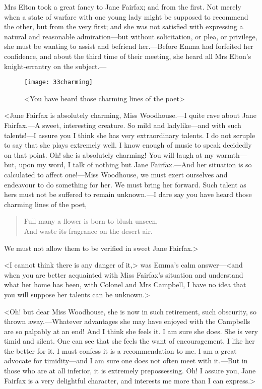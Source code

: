 Mrs Elton took a great fancy to Jane Fairfax; and from the first. Not merely when a state of warfare with one young lady might be supposed to recommend the other, but from the very first; and she was not satisfied with expressing a natural and reasonable admiration—but without solicitation, or plea, or privilege, she must be wanting to assist and befriend her.—Before Emma had forfeited her confidence, and about the third time of their meeting, she heard all Mrs Elton's knight-errantry on the subject.—

\begin{figure}[tbph]
\centering
\texttt{[image: 33charming]}
\caption{<You have heard those charming lines of the poet>}
\end{figure}

<Jane Fairfax is absolutely charming, Miss Woodhouse.—I quite rave about Jane Fairfax.—A sweet, interesting creature. So mild and ladylike—and with such talents!—I assure you I think she has very extraordinary talents. I do not scruple to say that she plays extremely well. I know enough of music to speak decidedly on that point. Oh! she is absolutely charming! You will laugh at my warmth—but, upon my word, I talk of nothing but Jane Fairfax.—And her situation is so calculated to affect one!—Miss Woodhouse, we must exert ourselves and endeavour to do something for her. We must bring her forward. Such talent as hers must not be suffered to remain unknown.—I dare say you have heard those charming lines of the poet,

\begin{verse}
Full many a flower is born to blush unseen,\\
    And waste its fragrance on the desert air.
\end{verse}

We must not allow them to be verified in sweet Jane Fairfax.>

<I cannot think there is any danger of it,> was Emma's calm answer—<and when you are better acquainted with Miss Fairfax's situation and understand what her home has been, with Colonel and Mrs Campbell, I have no idea that you will suppose her talents can be unknown.>

<Oh! but dear Miss Woodhouse, she is now in such retirement, such obscurity, so thrown away.—Whatever advantages she may have enjoyed with the Campbells are so palpably at an end! And I think she feels it. I am sure she does. She is very timid and silent. One can see that she feels the want of encouragement. I like her the better for it. I must confess it is a recommendation to me. I am a great advocate for timidity—and I am sure one does not often meet with it.—But in those who are at all inferior, it is extremely prepossessing. Oh! I assure you, Jane Fairfax is a very delightful character, and interests me more than I can express.>

